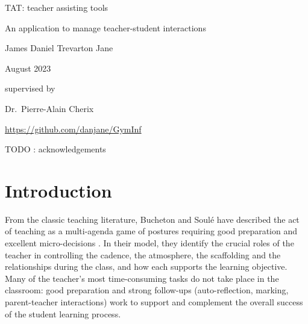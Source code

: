 \documentclass[10pt]{article}
\begin{document}
\begin{titlepage}
\large

\centering

{\Huge TAT: teacher assisting tools}

\vspace{5mm}

{\Large An application to manage teacher-student interactions}

\vfill
{\Large James Daniel Trevarton Jane}

\vspace{5mm}

August 2023

\vfill
supervised by

Dr.~Pierre-Alain Cherix
\vfill


\url{https://github.com/danjane/GymInf}



\end{titlepage}

\tableofcontents

TODO : acknowledgements

\section{Introduction}

From the classic teaching literature, Bucheton and Soulé have described the act of teaching as a multi-agenda game of postures requiring good preparation and excellent micro-decisions \cite{BS09}. In their model, they identify the crucial roles of the teacher in controlling the cadence, the atmosphere, the scaffolding and the relationships during the class, and how each supports the learning objective. Many of the teacher's most time-consuming tasks do not take place in the classroom: good preparation and strong follow-ups (auto-reflection, marking, parent-teacher interactions) work to support and complement the overall success of the student learning process.
\end{document}
